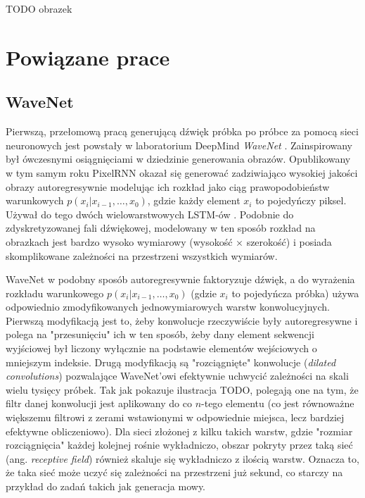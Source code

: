 \documentclass[magisterska]{pracamgr}
\begin{document}
TODO obrazek

\section{Powiązane prace}

\subsection{WaveNet}

Pierwszą, przełomową pracą generującą dźwięk próbka po próbce za pomocą sieci neuronowych jest powstały w laboratorium DeepMind \emph{WaveNet} \cite{oord2016wavenet}. Zainspirowany był ówczesnymi osiągnięciami w dziedzinie generowania obrazów. Opublikowany w tym samym roku PixelRNN \cite{oord2016pixelrnn} okazał się generować zadziwiająco wysokiej jakości obrazy autoregresywnie modelując ich rozkład jako ciąg prawopodobieństw warunkowych $p(x_i | x_{i-1}, \ldots, x_0)$, gdzie każdy element $x_i$ to pojedyńczy piksel. Używał do tego dwóch wielowarstwowych LSTM-ów \cite{hochreiter1997lstm}. Podobnie do zdyskretyzowanej fali dźwiękowej, modelowany w ten sposób rozkład na obrazkach jest bardzo wysoko wymiarowy (wysokość $\times$ szerokość) i posiada skomplikowane zależności na przestrzeni wszystkich wymiarów.

WaveNet w podobny sposób autoregresywnie faktoryzuje dźwięk, a do wyrażenia rozkładu warunkowego $p(x_i | x_{i - 1}, \ldots, x_0)$ (gdzie $x_i$ to pojedyńcza próbka) używa odpowiednio zmodyfikowanych jednowymiarowych warstw konwolucyjnych. Pierwszą modyfikacją jest to, żeby konwolucje rzeczywiście były autoregresywne i polega na "przesunięciu" ich w ten sposób, żeby dany element sekwencji wyjściowej był liczony wyłącznie na podstawie elementów wejściowych o mniejszym indeksie. Drugą modyfikacją są "rozciągnięte" konwolucje (\textit{dilated convolutions}) pozwalające WaveNet'owi efektywnie uchwycić zależności na skali wielu tysięcy próbek. Tak jak pokazuje ilustracja TODO, polegają one na tym, że filtr danej konwolucji jest aplikowany do co $n$-tego elementu (co jest równoważne większemu filtrowi z zerami wstawionymi w odpowiednie miejsca, lecz bardziej efektywne obliczeniowo). Dla sieci złożonej z kilku takich warstw, gdzie "rozmiar rozciągnięcia" każdej kolejnej rośnie wykładniczo, obszar pokryty przez taką sieć (ang. \textit{receptive field}) również skaluje się wykładniczo z ilością warstw. Oznacza to, że taka sieć może uczyć się zależności na przestrzeni już sekund, co starczy na przykład do zadań takich jak generacja mowy.
\end{document}
